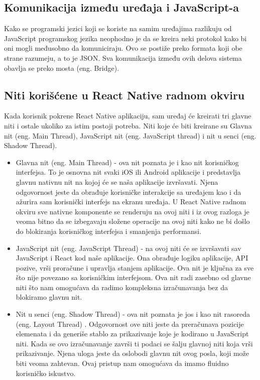 \documentclass[12pt,oneside]{memoir}
\begin{document}
\subsection{Komunikacija između uređaja i JavaScript-a}

Kako se programski jezici koji se koriste na samim uređajima razlikuju od JavaScript programskog jezika neophodno je da se kreira neki protokol kako bi oni mogli međusobno da komuniciraju. Ovo se postiže preko formata koji obe strane razumeju, a to je JSON. Sva komunikacija između ovih delova sistema obavlja se preko mosta (eng. Bridge).

\subsection{Niti korišćene u React Native radnom okviru}

Kada korisnik pokrene React Native aplikaciju, sam uređaj će kreirati tri glavne niti i ostale ukoliko za istim postoji potreba. Niti koje će biti kreirane su Glavna nit (eng. Main Thread), JavaScript nit (eng. JavaScript thread) i nit u senci (eng. Shadow Thread).

\begin{itemize}
    \item Glavna nit (eng. Main Thread) - ova nit poznata je i kao nit korisničkog interfejsa. To je osnovna nit svaki iOS ili Android aplikacije i predstavlja glavnu nativnu nit na kojoj će se naša aplikacije izvršavati. Njena odgovornost jeste da obrađuje korisničke interakcije sa uređajem kao i da ažurira sam korisnički interfejs na ekranu uređaja. U React Native radnom okviru sve nativne komponente se renderuju na ovoj niti i iz ovog razloga je veoma bitno da se izbegavaju složene operacije na ovoj niti kako ne bi došlo do blokiranja korisničkog interfejsa i smanjenja performansi.
    \item JavaScript nit (eng. JavaScript Thread) - na ovoj niti će se izvršavati sav JavaScript i React kod naše aplikacije. Ona obrađuje logiku aplikacije, API pozive, vrši proračune i upravlja stanjem aplikacije. Ova nit je ključna za sve što nije povezano sa korisničkim interfejsom. Ova nit radi zasebno od glavne niti što nam omogućava da radimo kompleksna izračunavanja bez da blokiramo glavnu nit. 
    \item Nit u senci (eng. Shadow Thread) - ova nit poznata je jos i kao nit rasoreda (eng. Layout Thread) . Odgovornost ove niti jeste da preračunava pozicije elemenata i da generiše stablo za prikazivanje koje je kodirano u JavaScript niti. Kada se ovo izračunavanje završi ti podaci se šalju glavnoj niti koja vrši prikazivanje. Njena uloga jeste da oslobodi glavnu nit ovog posla, koji može biti veoma zahtevan. Ovaj pristup nam omogućava da imamo fluidno korisničko iskustvo.
\end{itemize}
\end{document}
